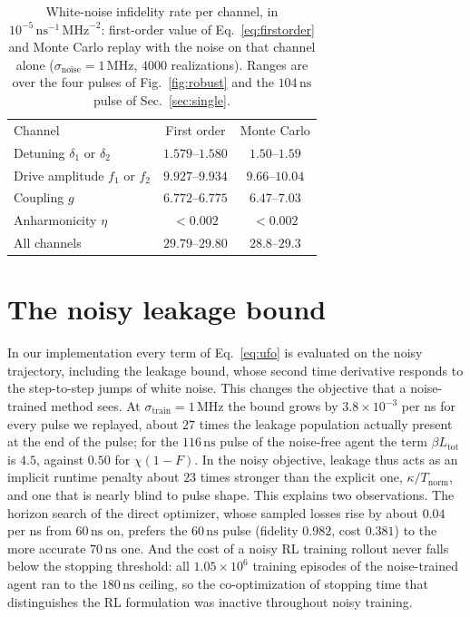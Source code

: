 \documentclass[aps,prx,twocolumn,superscriptaddress,nofootinbib,amsmath,amssymb,floatfix]{revtex4-2}
\newcommand{\Ltot}{L_{\mathrm{tot}}}
\newcommand{\snoise}{\sigma_{\mathrm{noise}}}
\newcommand{\strain}{\sigma_{\mathrm{train}}}
\newcommand{\ns}{\,\mathrm{ns}}
\newcommand{\MHz}{\,\mathrm{MHz}}
\begin{document}
\begin{table}[t]
\caption{White-noise infidelity rate per channel, in $10^{-5}\ns^{-1}\MHz^{-2}$: first-order value of
Eq.~\eqref{eq:firstorder} and Monte Carlo replay with the noise on that channel alone ($\snoise=1\MHz$,
$4000$ realizations). Ranges are over the four pulses of Fig.~\ref{fig:robust} and the $104\ns$ pulse of
Sec.~\ref{sec:single}.}
\label{tab:channels}
\begin{ruledtabular}
\begin{tabular}{lcc}
Channel & First order & Monte Carlo\\
\colrule
Detuning $\delta_1$ or $\delta_2$ & $1.579$--$1.580$ & $1.50$--$1.59$\\
Drive amplitude $f_1$ or $f_2$    & $9.927$--$9.934$ & $9.66$--$10.04$\\
Coupling $g$                      & $6.772$--$6.775$ & $6.47$--$7.03$\\
Anharmonicity $\eta$              & $<0.002$         & $<0.002$\\
\colrule
All channels                      & $29.79$--$29.80$ & $28.8$--$29.3$\\
\end{tabular}
\end{ruledtabular}
\end{table}

\section{The noisy leakage bound}
\label{app:leak}

In our implementation every term of Eq.~\eqref{eq:ufo} is evaluated on the noisy trajectory, including the
leakage bound, whose second time derivative responds to the step-to-step jumps of white noise. This
changes the objective that a noise-trained method sees. At $\strain=1\MHz$ the bound grows by $3.8\times10^{-3}$ per ns for
every pulse we replayed, about $27$ times the leakage population actually present at the end of the pulse;
for the $116\ns$ pulse of the noise-free agent the term $\beta\Ltot$ is $4.5$, against $0.50$ for $\chi(1-F)$. In the noisy
objective, leakage thus acts as an implicit runtime penalty about $23$ times stronger than the explicit
one, $\kappa/T_{\mathrm{norm}}$, and one that is nearly blind to pulse shape. This explains two
observations. The horizon search of the direct optimizer, whose sampled losses rise by about $0.04$ per ns from $60\ns$ on,
prefers the $60\ns$ pulse (fidelity $0.982$, cost $0.381$) to the more accurate $70\ns$ one. And the cost of a noisy RL training rollout never falls
below the stopping threshold: all $1.05\times10^6$ training episodes of the noise-trained agent ran to
the $180\ns$ ceiling, so the co-optimization of stopping time that distinguishes the RL formulation was
inactive throughout noisy training.
\end{document}

